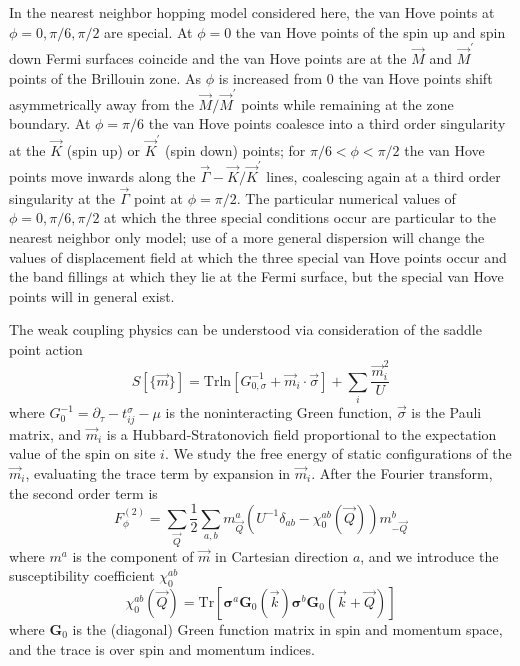 \documentclass[%
reprint,
superscriptaddress,
twocolumn,
 amsmath,amssymb,
 aps,
 prb,
]{revtex4-2}
\begin{document}
In the nearest neighbor hopping model considered here, the van Hove points at $\phi=0,\pi/6,\pi/2$ are special. At $\phi=0$ the van Hove points of the spin up and spin down Fermi surfaces coincide and the van Hove points are at the $\vec{M}$ and $\vec{M}^\prime$ points of the Brillouin zone. As $\phi$ is increased from $0$ the van Hove points shift asymmetrically away from the $\vec{M}/\vec{M}^\prime$ points while remaining at the zone boundary. At $\phi=\pi/6$ the van Hove points coalesce into a third order singularity at the $\vec{K}$ (spin up) or $\vec{K}^\prime$ (spin down) points; for $\pi/6<\phi<\pi/2$ the van Hove points move inwards along the $\vec{\Gamma}-\vec{K}/\vec{K}^\prime$ lines, coalescing again at a third order singularity at the $\vec{\Gamma}$ point at $\phi=\pi/2$. The particular numerical values of $\phi=0,\pi/6,\pi/2$ at which the three special conditions occur are particular to the nearest neighbor only model; use of a more general dispersion will change the  values of displacement field  at which the three special van Hove points occur and the band fillings  at which they lie at the Fermi surface, but the special van Hove points will in general exist.


The weak coupling physics can be understood via consideration of the saddle point action
\begin{equation}
    S[\{\vec{m}\}]=\text{Trln} \left[G_{0,\sigma}^{-1}+\vec{m}_i\cdot\vec{\sigma}\right]+\sum_i\frac{\vec{m}_i^2}{U}
    \label{action}
\end{equation}
where $G_0^{-1}=\partial_\tau-t_{ij}^\sigma-\mu$ is the noninteracting Green function, $\vec{\sigma}$ is the Pauli matrix, and $\vec{m}_i$ is a Hubbard-Stratonovich field proportional to the expectation value of the spin on site $i$. We study the free energy of static configurations of the $\vec{m}_i$, evaluating the trace term by expansion in $\vec{m}_i$. After the Fourier transform, the second order term is
\begin{equation}
    F^{(2)}_\phi=\sum_{\vec{Q}}\frac{1}{2}\sum_{a,b}m^a_{\vec{Q}}\left(U^{-1}\delta_{ab}-\chi^{ab}_0(\vec{Q})\right)m^b_{-\vec{Q}}
    \label{eq:S2}
\end{equation}
where $m^a$ is the component of $\vec{m}$ in Cartesian direction $a$, and we introduce the susceptibility coefficient $\chi^{ab}_0$ 
\begin{equation}
    \chi^{ab}_0(\vec Q)=\text{Tr}\left[\bm{\sigma}^a\mathbf{G}_0(\vec k)\bm{\sigma}^b\mathbf{G}_0(\vec k+ \vec Q)\right]
\end{equation}
where $\mathbf{G}_0$ is the (diagonal) Green function matrix in spin and momentum space, and the trace is over spin and momentum indices.
\end{document}
